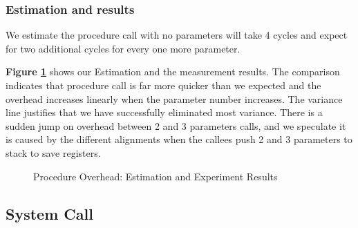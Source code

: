 
\subsubsection{Estimation and results}
We estimate the procedure call with no parameters will take 4 cycles and expect for two additional cycles for every one more parameter.

\textbf{Figure \ref{procedure_overhead_result}} shows our Estimation and the measurement results. The comparison indicates that procedure call is far more quicker than we expected and the overhead increases linearly when the parameter number increases. The variance line justifies that we have successfully eliminated most variance. There is a sudden jump on overhead between 2 and 3 parameters calls, and we speculate it is caused by the different alignments when the callees push 2 and 3
parameters to stack to save registers. 


\begin{figure}[h]
    \centering
    \caption{Procedure Overhead: Estimation and Experiment Results }
    \label{procedure_overhead_result}
\end{figure}


\subsection{System Call}

